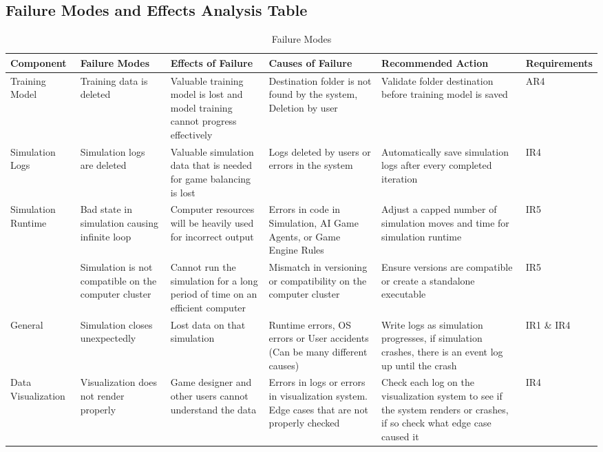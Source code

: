 \documentclass{article}
\begin{document}
\subsection{Failure Modes and Effects Analysis Table}
\begin{table}[H]
\begin{center}
    \caption{Failure Modes}
\end{center}
\begin{tabular}{| P{7em} | P{7em} | P{7em} | P{7em} | P{7em} | P{7em} |}
\hline
\textbf{Component} & \textbf{Failure Modes} & \textbf{Effects of \mbox{Failure}} & \textbf{Causes of \mbox{Failure}} & \textbf{Recommended Action} & \textbf{Requirements}\\
\hline
 Training Model & Training data is deleted & Valuable training model is lost and model training cannot progress effectively & Destination folder is not found by the system, Deletion by user & Validate folder destination before training model is saved & AR4 \\
 \hline
 Simulation Logs & Simulation logs are deleted & Valuable simulation data that is needed for game balancing is lost & Logs deleted by users or errors in the system & Automatically save simulation logs after every completed iteration & IR4\\
 \hline
 Simulation Runtime & Bad state in simulation causing infinite loop & Computer resources will be heavily used for incorrect output & Errors in code in Simulation, AI Game Agents, or Game Engine Rules & Adjust a capped number of simulation moves and time for simulation runtime & IR5\\
 & Simulation is not compatible on the computer cluster & Cannot run the simulation for a long period of time on an efficient computer & Mismatch in versioning or compatibility on the computer cluster & Ensure versions are compatible or create a standalone executable & IR5 \\
 \hline
 General & Simulation closes unexpectedly& Lost data on that simulation& Runtime errors, OS errors or User accidents (Can be many different causes) & Write logs as simulation progresses, if simulation crashes, there is an event log up until the crash & IR1 \& IR4\\
 \hline
 Data Visualization & Visualization does not render properly& Game designer and other users cannot understand the data & Errors in logs or errors in visualization system. Edge cases that are not properly checked& Check each log on the visualization system to see if the system renders or crashes, if so check what edge case caused it & IR4\\
 \hline

\end{tabular}
\end{table}
\end{document}
